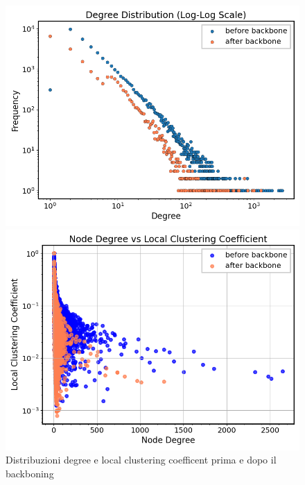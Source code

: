 \documentclass[sigchi]{acmart}
\begin{document}
\begin{figure}[h]
    \centering
    \begin{minipage}{0.48\textwidth}
        \centering
        \includegraphics[width=\linewidth]{img/Degree Distribution (Log-Log Scale).png}
    \end{minipage}
    \hfill
    \begin{minipage}{0.48\textwidth}
        \centering
        \includegraphics[width=\linewidth]{img/Node Degree vs Local Clustering Coefficient.png}
    \end{minipage}
    \caption{Distribuzioni degree e local clustering coefficent prima e dopo il backboning\label{fig:backboning_dist}}
\end{figure}
\end{document}

